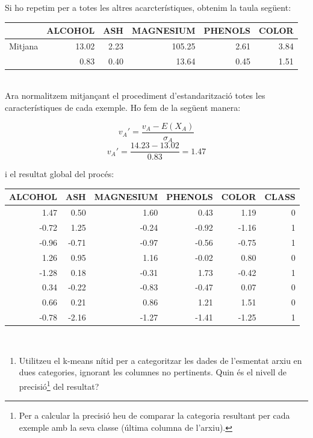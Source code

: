 \documentclass{article} %
\begin{document}
{	Si ho repetim per a totes les altres acarcterístiques, obtenim la taula següent: \\ 

	{\selectfont\small
	\begin{tabular}{c | r r r r r}
		 & ALCOHOL & ASH & MAGNESIUM & PHENOLS & COLOR \\ \hline
		 Mitjana & 13.02 & 2.23 & 105.25 & 2.61 & 3.84 \\
		\textsigma & 0.83 & 0.40 & 13.64 & 0.45 & 1.51 \\
	\end{tabular}
	}
	\\

	Ara normalitzem mitjançant el procediment d'estandarització totes les característiques de cada exemple. Ho fem de la següent manera:

	\[v_{A}' = \frac{v_{A} - E(X_{A})}{\sigma_{A}}\]
	\[v_{A}' = \frac{14.23 - 13.02}{0.83} = 1.47\]


	i el resultat global del procés:\\

	{\selectfont\small
	\begin{tabular}{r r r r r r}
	 	ALCOHOL & ASH & MAGNESIUM & PHENOLS & COLOR & CLASS \\ \hline
		 1.47 &  0.50 &  1.60 &  0.43 &  1.19 & 0 \\
		-0.72 &  1.25 & -0.24 & -0.92 & -1.16 & 1 \\
		-0.96 & -0.71 & -0.97 & -0.56 & -0.75 & 1 \\
		 1.26 &  0.95 &  1.16 & -0.02 &  0.80 & 0 \\
		-1.28 &  0.18 & -0.31 &  1.73 & -0.42 & 1 \\
		 0.34 & -0.22 & -0.83 & -0.47 &  0.07 & 0 \\
		 0.66 &  0.21 &  0.86 &  1.21 &  1.51 & 0 \\
		-0.78 & -2.16 & -1.27 & -1.41 & -1.25 & 1 \\
	\end{tabular}
	} \\

}
\begin{enumerate}[resume]
	\item Utilitzeu el k-means nítid per a categoritzar les dades de l'esmentat arxiu en dues categories, ignorant les columnes no pertinents. Quin és el nivell de precisió\footnote{Per a calcular la precisió heu de comparar la categoria resultant per cada exemple amb la seva classe (última columna de l’arxiu).} del resultat?
\end{enumerate}
\end{document}
